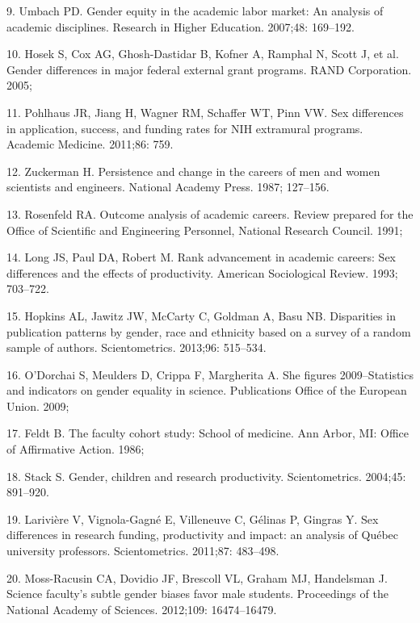 \documentclass[12pt,]{article}
\begin{document}
\hypertarget{ref-Umbach_2007}{}
9. Umbach PD. Gender equity in the academic labor market: An analysis of
academic disciplines. Research in Higher Education. 2007;48: 169--192.

\hypertarget{ref-Hosek_2005}{}
10. Hosek S, Cox AG, Ghosh-Dastidar B, Kofner A, Ramphal N, Scott J, et
al. Gender differences in major federal external grant programs. RAND
Corporation. 2005;

\hypertarget{ref-pohlhaus_2011}{}
11. Pohlhaus JR, Jiang H, Wagner RM, Schaffer WT, Pinn VW. Sex
differences in application, success, and funding rates for NIH
extramural programs. Academic Medicine. 2011;86: 759.

\hypertarget{ref-Zuckerman_1987}{}
12. Zuckerman H. Persistence and change in the careers of men and women
scientists and engineers. National Academy Press. 1987; 127--156.

\hypertarget{ref-Rosenfeld_1991}{}
13. Rosenfeld RA. Outcome analysis of academic careers. Review prepared
for the Office of Scientific and Engineering Personnel, National
Research Council. 1991;

\hypertarget{ref-Long_1993}{}
14. Long JS, Paul DA, Robert M. Rank advancement in academic careers:
Sex differences and the effects of productivity. American Sociological
Review. 1993; 703--722.

\hypertarget{ref-Hopkins_2013}{}
15. Hopkins AL, Jawitz JW, McCarty C, Goldman A, Basu NB. Disparities in
publication patterns by gender, race and ethnicity based on a survey of
a random sample of authors. Scientometrics. 2013;96: 515--534.

\hypertarget{ref-ODorchai_2009}{}
16. O'Dorchai S, Meulders D, Crippa F, Margherita A. She figures
2009--Statistics and indicators on gender equality in science.
Publications Office of the European Union. 2009;

\hypertarget{ref-Feldt_1986}{}
17. Feldt B. The faculty cohort study: School of medicine. Ann Arbor,
MI: Office of Affirmative Action. 1986;

\hypertarget{ref-Stack_2004}{}
18. Stack S. Gender, children and research productivity. Scientometrics.
2004;45: 891--920.

\hypertarget{ref-Lariviere_2011}{}
19. Larivière V, Vignola-Gagné E, Villeneuve C, Gélinas P, Gingras Y.
Sex differences in research funding, productivity and impact: an
analysis of Québec university professors. Scientometrics. 2011;87:
483--498.

\hypertarget{ref-Moss_2012}{}
20. Moss-Racusin CA, Dovidio JF, Brescoll VL, Graham MJ, Handelsman J.
Science faculty's subtle gender biases favor male students. Proceedings
of the National Academy of Sciences. 2012;109: 16474--16479.
\end{document}

